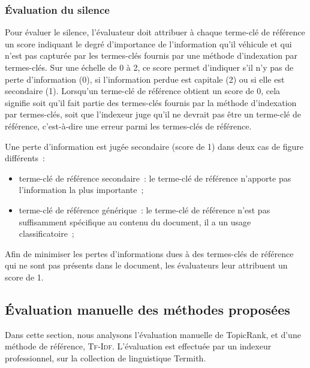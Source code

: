       \subsubsection{Évaluation du silence}
      \label{subsubsec:main-automatic_evaluation_of_keyphrase_annotation-methodology-evaluation_protocol-silence}
        Pour évaluer le silence, l'évaluateur doit attribuer à chaque terme-clé
        de référence un score indiquant le degré d'importance de l'information
        qu'il véhicule et qui n'est pas capturée par les termes-clés fournis par
        une méthode d'indexation par termes-clés. Sur une échelle de 0 à 2, ce
        score permet d'indiquer s'il n'y pas de perte d'information (0), si
        l'information perdue est capitale (2) ou si elle est secondaire (1).
        Lorsqu'un terme-clé de référence obtient un score de 0, cela signifie
        soit qu'il fait partie des termes-clés fournis par la méthode
        d'indexation par termes-clés, soit que l'indexeur juge qu'il ne devrait
        pas être un terme-clé de référence, c'est-à-dire une erreur parmi les
        termes-clés de référence.

        Une perte d'information est jugée secondaire (score de 1) dans deux
        cas de figure différents~:
        \begin{itemize}
          \item{terme-clé de référence secondaire~: le terme-clé de référence
                n'apporte pas l'information la plus importante~;}
          \item{terme-clé de référence générique~: le terme-clé de référence
                n'est pas suffisamment spécifique au contenu du document, il a
                un usage classificatoire~;}
        \end{itemize}
        Afin de minimiser les pertes d'informations dues à des termes-clés de
        référence qui ne sont pas présents dans le document, les évaluateurs
        leur attribuent un score de 1.

    \subsection{Évaluation manuelle des méthodes proposées}
    \label{subsec:main-domain_specific_keyphrase_annotation-manual_evaluation-analysis}
      Dans cette section, nous analysons l'évaluation manuelle de TopicRank,
      et d'une méthode de référence, \textsc{Tf-Idf}. L'évaluation est
      effectuée par un indexeur professionnel, sur la collection de linguistique
      Termith.

